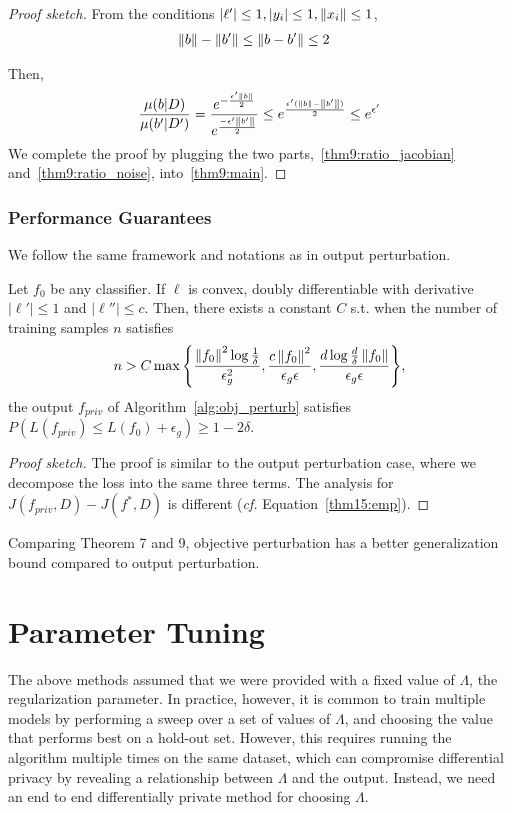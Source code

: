 \documentclass{article} %
\begin{document}
\begin{proof}[Proof sketch]
From the conditions $\left\lvert\ell'\right\rvert \le 1, \left\lvert y_i\right\rvert \le 1, \left\lVert x_i\right\rVert \le 1$,
\begin{align*}
& \left\lVert b\right\rVert - \left\lVert b'\right\rVert \le \left\lVert b - b'\right\rVert \le 2
\end{align*}

Then, \begin{align}
 \frac{\mu(b | D)}{\mu(b' | D')} = \frac{e^{-\frac{\epsilon' \left\lVert b\right\rVert}{2}}}{e^{\frac{-\epsilon' \left\lVert b'\right\rVert}{2}}}\le e^{\frac{\epsilon'(\left\lVert b\right\rVert - \left\lVert b'\right\rVert)}{2}} \le e^{\epsilon'} \label{thm9:ratio_noise}
\end{align}
We complete the proof by plugging the two parts,~\eqref{thm9:ratio_jacobian} and~\eqref{thm9:ratio_noise}, into~\eqref{thm9:main}.
\end{proof}

\subsubsection{Performance Guarantees}
We follow the same framework and notations as in output perturbation.
\begin{theorem}
Let $f_0$ be any classifier. If $\ell$ is convex, doubly differentiable with derivative $|\ell'| \le 1$ and $|\ell''| \le c$. Then, there exists a constant $C$ s.t. when the number of training samples $n$ satisfies
$$n > C\max{\left\{ \frac{\left\lVert f_0\right\rVert^2 \log{\frac{1}{\delta}}}{\epsilon_g^2}, \frac{c\left\lVert f_0\right\rVert^2}{\epsilon_g \epsilon}, \frac{d\log{\frac{d}{\delta}} \left\lVert f_0\right\rVert}{\epsilon_g\epsilon}\right\}},$$
the output $f_{priv}$ of Algorithm~\ref{alg:obj_perturb} satisfies $P(L(f_{priv}) \le L(f_0) + \epsilon_g) \ge 1 - 2\delta$.
\end{theorem}
\begin{proof}[Proof sketch]
The proof is similar to the output perturbation case, where we decompose the loss into the same three terms. The analysis for $J(f_{priv}, D) - J(f^*, D)$ is different (\emph{cf.} Equation~\eqref{thm15:emp}).
\end{proof}

Comparing Theorem 7 and 9, objective perturbation has a better generalization bound compared to output perturbation.


\section{Parameter Tuning}
The above methods assumed that we were provided with a fixed value of $\Lambda$,
the regularization parameter. In practice, however, it is common to train
multiple models by performing a sweep over a set of values of $\Lambda$, and
choosing the value that performs best on a hold-out set. However, this requires
running the algorithm multiple times on the same dataset, which can compromise
differential privacy by revealing a relationship between $\Lambda$ and the
output. Instead, we need an end to end differentially private method for
choosing $\Lambda$.
\end{document}
